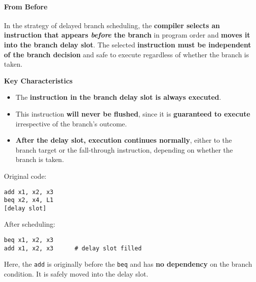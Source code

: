 \paragraph{From Before}\label{paragraph: From Before}

In the  strategy of delayed branch scheduling, the \textbf{compiler selects an instruction that appears \emph{before} the branch} in program order and \textbf{moves it into the branch delay slot}. The selected \textbf{instruction must be independent of the branch decision} and safe to execute regardless of whether the branch is taken.

\highspace
\begin{flushleft}
    \textcolor{Green3}{ \textbf{Key Characteristics}}
\end{flushleft}
\begin{itemize}
    \item The \textbf{instruction in the branch delay slot is always executed}.
    \item This instruction \textbf{will never be flushed}, since it is \textbf{guaranteed to execute} irrespective of the branch's outcome.
    \item \textbf{After the delay slot, execution continues normally}, either to the branch target or the fall-through instruction, depending on whether the branch is taken.
\end{itemize}

\begin{examplebox}
    Original code:
    \begin{lstlisting}[language=riscv]
add x1, x2, x3
beq x2, x4, L1
[delay slot]\end{lstlisting}
    After scheduling:
    \begin{lstlisting}[language=riscv]
beq x1, x2, x3
add x1, x2, x3      # delay slot filled\end{lstlisting}
    Here, the \texttt{add} is originally before the \texttt{beq} and has \textbf{no dependency} on the branch condition. It is safely moved into the delay slot.
\end{examplebox}

